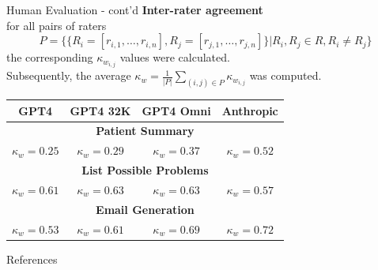 \documentclass[usenames,dvipsnames]{beamer}
\begin{document}
\begin{frame}{Human Evaluation - cont'd}
  \textbf{Inter-rater agreement}\\
  for all pairs of raters 
  \[
  P=\{\{R_i= [r_{i,1}, \ldots, r_{i,n}],R_j = [r_{j,1},\ldots,r_{j,n}]\}|R_i,R_j\in R, R_i\neq R_j\}
  \]
  the corresponding $\kappa_{w_{i,j}}$ values were calculated.\\
  Subsequently, the average $\kappa_w = \frac{1}{|P|}\sum_{(i,j)\in P} \kappa_{w_{i,j}}$ was computed.

  \begin{table}[b]
    \centering
    \setlength{\extrarowheight}{2pt}
    \begin{tabular}{|c|c|c|c|}
    \hline
    GPT4 & GPT4 32K & GPT4 Omni & Anthropic\\
    \hline
    \multicolumn{4}{|c|}{\textbf{Patient Summary}} \\
    \hline
    $\kappa_w=0.25$ & $\kappa_w=0.29$ & $\kappa_w=0.37$ & $\kappa_w=0.52$ \\
    \hline
    \multicolumn{4}{|c|}{\textbf{List Possible Problems}} \\
    \hline
    $\kappa_w=0.61$ & $\kappa_w=0.63$ & $\kappa_w=0.63$ & $\kappa_w=0.57$ \\
    \hline
    \multicolumn{4}{|c|}{\textbf{Email Generation}} \\
    \hline
    $\kappa_w=0.53$ & $\kappa_w=0.61$ & $\kappa_w=0.69$ & $\kappa_w=0.72$ \\
    \hline
    \end{tabular}
  \end{table}

\end{frame}

\begin{frame}{}
  


\end{frame}

\begin{frame}{}
  


\end{frame}

\begin{frame}{References}


\end{frame}
\end{document}
